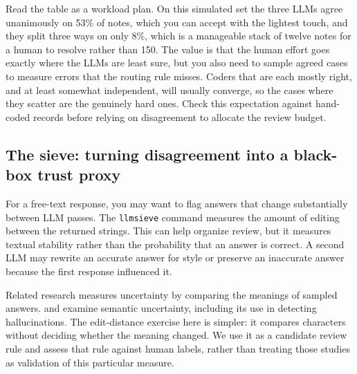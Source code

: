 \medskip
Read the table as a workload plan. On this simulated set the three LLMs agree unanimously on 53\% of notes, which you can accept with the lightest touch, and they split three ways on only 8\%, which is a manageable stack of twelve notes for a human to resolve rather than 150. The value is that the human effort goes exactly where the LLMs are least sure, but you also need to sample agreed cases to measure errors that the routing rule misses. Coders that are each mostly right, and at least somewhat independent, will usually converge, so the cases where they scatter are the genuinely hard ones. Check this expectation against hand-coded records before relying on disagreement to allocate the review budget.

\subsection{The sieve: turning disagreement into a black-box trust proxy}\label{sec:sieve}
For a free-text response, you may want to flag answers that change substantially between LLM passes. The \texttt{llmsieve} command measures the amount of editing between the returned strings. This can help organize review, but it measures textual stability rather than the probability that an answer is correct. A second LLM may rewrite an accurate answer for style or preserve an inaccurate answer because the first response influenced it.

Related research measures uncertainty by comparing the meanings of sampled answers. \textcite{kuhn2023semantic} and \textcite{farquhar2024semantic} examine semantic uncertainty, including its use in detecting hallucinations. The edit-distance exercise here is simpler: it compares characters without deciding whether the meaning changed. We use it as a candidate review rule and assess that rule against human labels, rather than treating those studies as validation of this particular measure.

